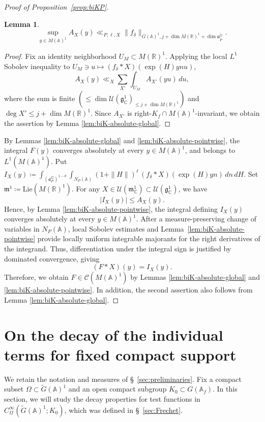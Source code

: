 \documentclass[12pt]{amsart}
\theoremstyle{definition}
\theoremstyle{plain}
\newtheorem{lemma}[definition]{Lemma}
\theoremstyle{remark}
\def\C{\mathbb{C}}%
\def\R{\mathbb{R}}%
\def\A{\mathbb{A}}%
\newcommand{\fa}{\mathfrak{a}}
\newcommand{\fg}{\mathfrak{g}}
\newcommand{\fm}{\mathfrak{m}}
\newcommand{\cC}{\mathcal{C}}
\newcommand{\cU}{\mathcal{U}}
\numberwithin{equation}{section}
\newcommand{\tG}{\widetilde{G}}
\newcommand{\tP}{\widetilde{P}}
\begin{document}
\begin{proof}[Proof of Proposition~\ref{prop:biKP}]
\begin{lemma}
\begin{equation*}
\sup_{y\in M(\A)^1}A_X(y)
\ll_{P,\ell,X}\|f_\delta\|_{G(\A)^1,j+\dim M(\R)^1 + \dim\fa_{\tP}^{\tG}}.
\end{equation*}
\end{lemma}
\begin{proof}
Fix an identity neighborhood $U_M\subset M(\R)^1$.
Applying the local $L^1$ Sobolev inequality to $U_M\ni u\mapsto(f_\delta*X)(\exp(H)ynu)$, 
\[
A_X(y) \ll_X \sum_{X'}\int_{U_M}A_{X'}(yu)\,du,
\]
where the sum is finite $(\le \dim \cU(\fg^1_\C)_{\le j+\dim M(\R)^1})$ and $\deg X'\le j+\dim M(\R)^1$.
Since $A_{X'}$ is right-$K_f\cap M(\A)^1$-invariant, we obtain the assertion by Lemma \ref{lem:biK-absolute-global}.
\end{proof}


By Lemmas \ref{lem:biK-absolute-global} and \ref{lem:biK-absolute-pointwise},  the integral $F(y)$ converges absolutely at every $y\in M(\A)^1$, and belongs to $L^1(M(\A)^1)$.
Put $I_X(y)\coloneqq
\int_{(\fa_P^G)^{1-\theta}}\int_{N_P(\A)}
(1+\|H\|)^\ell \, (f_\delta*X)(\exp(H)yn)\,dn\,dH$. 
Set $\fm^1\coloneqq \mathrm{Lie}(M(\R)^1)$. 
For any $X\in\cU(\fm^1_\C)\subset \cU(\fg^1_\C)$, we have 
\[
 |I_X(y)|\le A_X(y).
\]
Hence, by Lemma \ref{lem:biK-absolute-pointwise}, the integral defining $I_X(y)$ converges absolutely at every $y\in M(\A)^1$.
After a measure-preserving change of variables in $N_P(\A)$, local Sobolev estimates and Lemma~\ref{lem:biK-absolute-pointwise} provide locally uniform integrable majorants for the right derivatives of the integrand.
Thus, differentiation under the integral sign is justified by dominated convergence, giving
\[
(F*X)(y)=I_X(y).
\]
Therefore, we obtain $F\in\cC(M(\A)^1)$ by Lemmas \ref{lem:biK-absolute-global} and \ref{lem:biK-absolute-pointwise}. 
In addition, the second assertion also follows from Lemma \ref{lem:biK-absolute-global}. 
\end{proof}












\section{On the decay of the individual terms for fixed compact support}
\label{sec:cga}

We retain the notation and measures of \S~\ref{sec:preliminaries}.
Fix a compact subset $\Omega\subset\tG(\A)^1$ and an open compact
subgroup $K_0\subset G(\A_f)$. 
In this section, we will study the decay properties for test functions in $C_\Omega^\infty(\tG(\A)^1;K_0)$, which was defined in \S~\ref{sec:Frechet}. 
\end{document}
